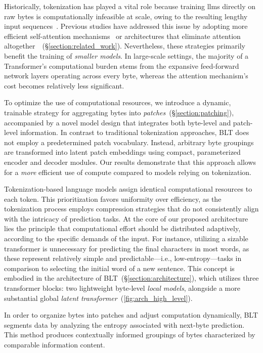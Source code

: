 Historically, tokenization has played a vital role because training llms directly on raw bytes is computationally infeasible at scale, owing to the resulting lengthy input sequences~\citep{xue2022byt5}. Previous studies have addressed this issue by adopting more efficient self-attention mechanisms~\citep{el2020characterbert, clark2022canine} or architectures that eliminate attention altogether~\citep{wang2024mambabyte}~(\S\ref{section:related_work}). Nevertheless, these strategies primarily benefit the training of \textit{smaller models}. In large-scale settings, the majority of a Transformer's computational burden stems from the expansive feed-forward network layers operating across every byte, whereas the attention mechanism's cost becomes relatively less significant.

To optimize the use of computational resources, we introduce a dynamic, trainable strategy for aggregating bytes into \textit{patches}~(\S\ref{section:patching}), accompanied by a novel model design that integrates both byte-level and patch-level information. In contrast to traditional tokenization approaches, {\textsc BLT} does not employ a predetermined patch vocabulary. Instead, arbitrary byte groupings are transformed into latent patch embeddings using compact, parameterized encoder and decoder modules. Our results demonstrate that this approach allows for a \textit{more} efficient use of compute compared to models relying on tokenization.

Tokenization-based language models assign identical computational resources to each token. This prioritization favors uniformity over efficiency, as the tokenization process employs compression strategies that do not consistently align with the intricacy of prediction tasks. At the core of our proposed architecture lies the principle that computational effort should be distributed adaptively, according to the specific demands of the input. For instance, utilizing a sizable transformer is unnecessary for predicting the final characters in most words, as these represent relatively simple and predictable—i.e., low-entropy—tasks in comparison to selecting the initial word of a new sentence. This concept is embodied in the architecture of {\textsc BLT}~(\S\ref{section:architecture}), which utilizes three transformer blocks: two lightweight byte-level \textit{local models}, alongside a more substantial global \textit{latent transformer}~(\autoref{fig:arch_high_level}). 

In order to organize bytes into patches and adjust computation dynamically, {\textsc BLT} segments data by analyzing the entropy associated with next-byte prediction. This method produces contextually informed groupings of bytes characterized by comparable information content.

